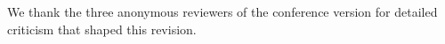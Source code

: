 We thank the three anonymous reviewers of the conference version for detailed criticism that shaped this revision.
